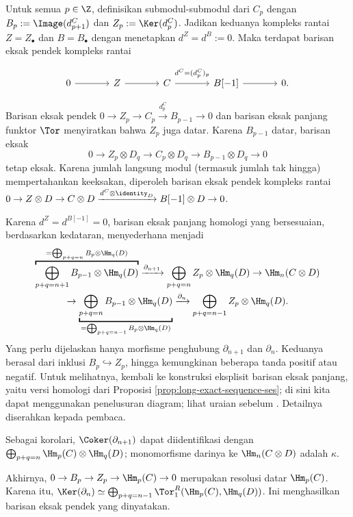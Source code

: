 \begin{bukti}
Untuk semua $p\in\Z$, definisikan submodul-submodul dari $C_p$ dengan
$B_p:=\Image(d^C_{p+1})$ dan $Z_p:=\Ker(d^C_p)$. Jadikan keduanya kompleks
rantai $Z=Z_\bullet$ dan $B=B_\bullet$ dengan menetapkan $d^Z=d^B:=0$.
Maka terdapat barisan eksak pendek kompleks rantai
\[
\begin{tikzcd}[column sep=large]
0 \arrow[r] & Z \arrow[r] & C \arrow[r, "{d^C=(d^C_p)_p}" inner sep=0.6em]
& B[-1] \arrow[r] & 0.
\end{tikzcd}
\]

Barisan eksak pendek $0\to Z_p\to C_p\xrightarrow{d^C_p}B_{p-1}\to0$
dan barisan eksak panjang funktor $\Tor$ menyiratkan bahwa $Z_p$ juga datar.
Karena $B_{p-1}$ datar, barisan eksak
\[
0\to Z_p\otimes D_q\to C_p\otimes D_q\to B_{p-1}\otimes D_q\to0
\]
tetap eksak. Karena jumlah langsung modul (termasuk jumlah tak hingga)
mempertahankan keeksakan, diperoleh barisan eksak pendek kompleks rantai
$0\to Z\otimes D\to C\otimes D\xrightarrow{d^C\otimes\identity_D}
B[-1]\otimes D\to0$.

Karena $d^Z=d^{B[-1]}=0$, barisan eksak panjang homologi yang bersesuaian,
berdasarkan kedataran, menyederhana menjadi
\begin{multline*}
\overbracket{\displaystyle\bigoplus_{p+q=n+1}B_{p-1}\otimes\Hm_q(D)}^{=
\bigoplus_{p+q=n}B_p\otimes\Hm_q(D)}\xrightarrow{\partial_{n+1}}
\displaystyle\bigoplus_{p+q=n}Z_p\otimes\Hm_q(D)\to\Hm_n(C\otimes D)\\
\to\underbracket{\displaystyle\bigoplus_{p+q=n}B_{p-1}\otimes\Hm_q(D)}_{=
\bigoplus_{p+q=n-1}B_p\otimes\Hm_q(D)}\xrightarrow{\partial_n}
\displaystyle\bigoplus_{p+q=n-1}Z_p\otimes\Hm_q(D).
\end{multline*}
Yang perlu dijelaskan hanya morfisme penghubung $\partial_{n+1}$ dan
$\partial_n$. Keduanya berasal dari inklusi $B_p\hookrightarrow Z_p$, hingga
kemungkinan beberapa tanda positif atau negatif. Untuk melihatnya, kembali ke
konstruksi eksplisit barisan eksak panjang, yaitu versi homologi dari Proposisi
\ref{prop:long-exact-sequence-ses}; di sini kita dapat menggunakan penelusuran
diagram; lihat uraian sebelum \cite[Proposisi 6.8.6]{Li1}. Detailnya diserahkan
kepada pembaca.

Sebagai korolari, $\Coker(\partial_{n+1})$ dapat diidentifikasi dengan
$\bigoplus_{p+q=n}\Hm_p(C)\otimes\Hm_q(D)$; monomorfisme darinya ke
$\Hm_n(C\otimes D)$ adalah $\kappa$.

Akhirnya, $0\to B_p\to Z_p\to\Hm_p(C)\to0$ merupakan resolusi datar
$\Hm_p(C)$. Karena itu,
$\Ker(\partial_n)\simeq\bigoplus_{p+q=n-1}\Tor_1^R(\Hm_p(C),\Hm_q(D))$.
Ini menghasilkan barisan eksak pendek yang dinyatakan.
\end{bukti}


